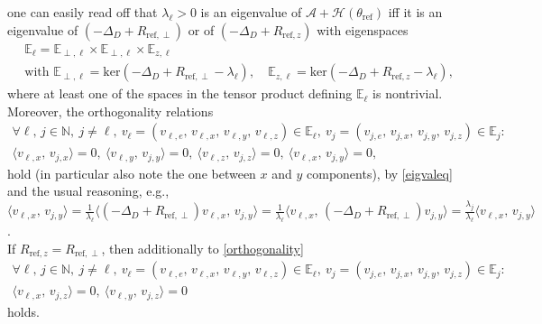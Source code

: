 \documentclass[12pt]{article}
\newcommand\calA{\mathcal{A}}
\newcommand\HH{\mathcal{H}}
\begin{document}
one can easily read off that $\lambda_\ell>0$ is an eigenvalue of $\calA+\HH(\theta_{\text{ref}})$ iff it is an eigenvalue of $(-\Delta_D+R_{\text{ref},\perp})$ or of $(-\Delta_D+R_{\text{ref},z})$ with eigenspaces 
\[
\begin{aligned}
&\mathbb{E}_\ell = 
\mathbb{E}_{\perp,\ell}\times\mathbb{E}_{\perp,\ell}\times\mathbb{E}_{z,\ell}
\\
&\text{with } 
\mathbb{E}_{\perp,\ell}=\text{ker}(-\Delta_D+R_{\text{ref},\perp}-\lambda_\ell),\quad
\mathbb{E}_{z,\ell}=\text{ker}(-\Delta_D+R_{\text{ref},z}-\lambda_\ell),
\end{aligned}
\]
where at least one of the spaces in the tensor product defining $\mathbb{E}_\ell$ is nontrivial.
Moreover, the orthogonality relations
\begin{equation}\label{orthogonality}
\begin{aligned}
\forall \ell,\, j\in\mathbb{N}, \ j\not=\ell, \ v_\ell=(v_{\ell,e},\,v_{\ell,x},\,v_{\ell,y},\,v_{\ell,z}) \in \mathbb{E}_\ell, \  
v_j=(v_{j,e},\,v_{j,x},\,v_{j,y},\,v_{j,z}) \in \mathbb{E}_j:\\
\langle v_{\ell,x},\,v_{j,x} \rangle=0, \  
\langle v_{\ell,y},\,v_{j,y} \rangle=0, \
\langle v_{\ell,z},\,v_{j,z} \rangle=0, \
\langle v_{\ell,x},\,v_{j,y} \rangle=0, \
\end{aligned}
\end{equation}
hold (in particular also note the one between $x$ and $y$ components), 
by \eqref{eigvaleq}
and the usual reasoning, e.g., 
$\langle v_{\ell,x},\,v_{j,y} \rangle
=\frac{1}{\lambda_\ell} \langle (-\Delta_D+R_{\text{ref},\perp})v_{\ell,x},\,v_{j,y} \rangle
=\frac{1}{\lambda_\ell} \langle v_{\ell,x},\,(-\Delta_D+R_{\text{ref},\perp})v_{j,y} \rangle
=\frac{\lambda_j}{\lambda_\ell} \langle v_{\ell,x},\,v_{j,y} \rangle$.
\\
If $R_{\text{ref},z}=R_{\text{ref},\perp}$, then additionally to \eqref{orthogonality}
\begin{equation}\label{orthogonality_RperpRz}
\begin{aligned}
\forall \ell,\, j\in\mathbb{N}, \ j\not=\ell, \ v_\ell=(v_{\ell,e},\,v_{\ell,x},\,v_{\ell,y},\,v_{\ell,z}) \in \mathbb{E}_\ell, \  
v_j=(v_{j,e},\,v_{j,x},\,v_{j,y},\,v_{j,z}) \in \mathbb{E}_j:\\
\langle v_{\ell,x},\,v_{j,z} \rangle=0, \
\langle v_{\ell,y},\,v_{j,z} \rangle=0 
\end{aligned}
\end{equation}
holds.
\end{document}
